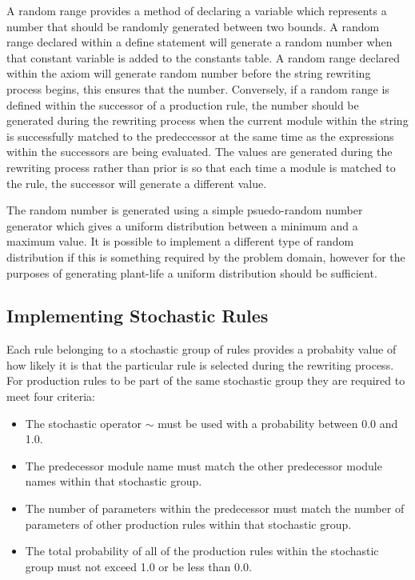 A random range provides a method of declaring a variable which represents a number that should be randomly generated between two bounds. A random range declared within a define statement will generate a random number when that constant variable is added to the constants table. A random range declared within the axiom will generate random number before the string rewriting process begins, this ensures that the number. Conversely, if a random range is defined within the successor of a production rule, the number should be generated during the rewriting process when the current module within the string is successfully matched to the predeccessor at the same time as the expressions within the successors are being evaluated. The values are generated during the rewriting process rather than prior is so that each time a module is matched to the rule, the successor will generate a different value. 

The random number is generated using a simple psuedo-random number generator which gives a uniform distribution between a minimum and a maximum value. It is possible to implement a different type of random distribution if this is something required by the problem domain, however for the purposes of generating plant-life a uniform distribution should be sufficient. 

\subsection{Implementing Stochastic Rules}

Each rule belonging to a stochastic group of rules provides a probabity value of how likely it is that the particular rule is selected during the rewriting process. For production rules to be part of the same stochastic group they are required to meet four criteria: 

\begin{itemize}
\item The stochastic operator $\sim$ must be used with a probability between 0.0 and 1.0.
\item The predecessor module name must match the other predecessor module names within that stochastic group.
\item The number of parameters within the predecessor must match the number of parameters of other production rules within that stochastic group.
\item The total probability of all of the production rules within the stochastic group must not exceed 1.0 or be less than 0.0.
\end{itemize}

